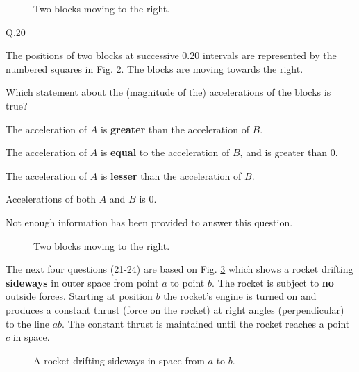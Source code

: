     \begin{figure}[h!]
        \begin{center}
            
            \caption{\label{fig:blocks19} Two blocks moving to the right.}
        \end{center}
    \end{figure}


    \begin{mcq}{Q.20}{The positions of two blocks at successive \SI{0.20}{\sec} intervals are represented by the numbered squares in Fig. \ref{fig:blocks20}. The blocks are moving towards the right.

            \eline[]
            Which statement about the (magnitude of the) accelerations of the blocks is true?
            \eline[0.5]
    }
        \item The acceleration of $A$ is \textbf{greater} than the acceleration of $B$.
        \item The acceleration of $A$ is \textbf{equal} to the acceleration of $B$, and is greater than $0$.
        \item The acceleration of $A$ is \textbf{lesser} than the acceleration of $B$.
        \item Accelerations of both $A$ and $B$ is $0$.
        \item Not enough information has been provided to answer this question.
    \end{mcq}

    \begin{figure}[h!]
        \begin{center}
            
            \caption{\label{fig:blocks20} Two blocks moving to the right.}
        \end{center}
    \end{figure}


    \eline[2]
    The next four questions (21-24) are based on Fig. \ref{fig:rocket} which shows a rocket drifting \textbf{sideways} in outer space from point $a$ to point $b$. The rocket is subject to \textbf{no} outside forces. Starting at position $b$ the rocket's engine is turned on and produces a constant thrust (force on the rocket) at right angles (perpendicular) to the line $ab$. The constant thrust is maintained until the rocket reaches a point $c$ in space.
    \eline[]

    \begin{figure}[h!]
        \begin{center}
            
            \caption{\label{fig:rocket} A rocket drifting sideways in space from $a$ to $b$.}
        \end{center}
    \end{figure}


